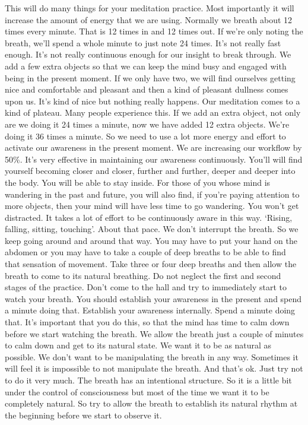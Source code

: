 \documentclass[letterpaper,10pt,english]{sphinxmanual}
\begin{document}
\sphinxAtStartPar
This  will  do  many  things  for  your  meditation  practice.  Most  importantly it will increase the amount of energy that we are using. Normally we
breath about 12 times every minute. That is 12 times in and 12 times out.
If we’re only noting the breath, we’ll spend a whole minute to just note 24
times. It’s not really fast enough. It’s not really continuous enough for our
insight  to  break  through. We  add  a  few  extra  objects  so  that  we  can  keep
the mind busy and engaged with being in the present moment. If we only
have two, we will find ourselves getting nice and comfortable and pleasant
and  then  a  kind  of  pleasant  dullness  comes  upon  us.  It’s  kind  of  nice  but
nothing  really  happens.  Our  meditation  comes  to  a  kind  of  plateau.  Many
people experience this. If we add an extra object, not only are we doing it
24 times a minute, now we have added 12 extra objects. We’re doing it 36
times a minute. So we need to use a lot more energy and effort to activate
our awareness in the present moment. We are increasing our workflow by
50\%.  It’s  very  effective  in  maintaining  our  awareness  continuously. You’ll
  will find yourself becoming closer and closer, further and further, deeper and
deeper into the body. You will be able to stay inside. For those of you whose
mind is wandering in the past and future, you will also find, if you’re paying
attention to more objects, then your mind will have less time to go wandering. You won’t get distracted. It takes a lot of effort to be continuously aware
in  this  way.  ‘Rising,  falling,  sitting,  touching’. About  that  pace.  We  don’t
interrupt the breath. So we keep going around and around that way. You may
have to put your hand on the abdomen or you may have to take a couple of
deep  breaths  to  be  able  to  find  that  sensation  of  movement. Take  three  or
four deep breaths and then allow the breath to come to its natural breathing.
Do not neglect the first and second stages of the practice. Don’t come to
the hall and try to immediately start to watch your breath. You should establish your awareness in the present and spend a minute doing that. Establish
your awareness internally. Spend a minute doing that. It’s important that you
do this, so that the mind has time to calm down before we start watching the
breath. We allow the breath just a couple of minutes to calm down and get to
its natural state. We want it to be as natural as possible. We don’t want to be
manipulating the breath in any way. Sometimes it will feel it is impossible
to not manipulate the breath. And that’s ok. Just try not to do it very much.
The breath has an intentional structure. So it is a little bit under the control
of consciousness but most of the time we want it to be completely natural. So
try to allow the breath to establish its natural rhythm at the beginning before
we start to observe it.
\end{document}
